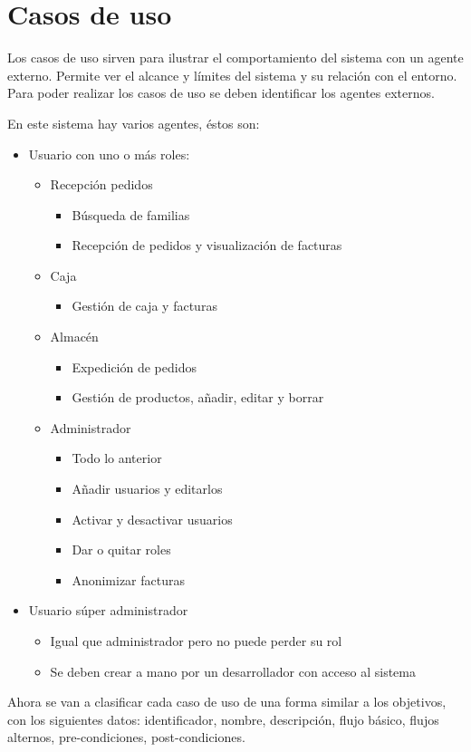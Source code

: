 \section{Casos de uso}
Los casos de uso sirven para ilustrar el comportamiento del sistema con un agente externo. Permite ver el alcance y límites del sistema y su relación con el entorno. Para poder realizar los casos de uso se deben identificar los agentes externos.
\vspace{1em}
\par En este sistema hay varios agentes, éstos son:
\begin{itemize}
    \item Usuario con uno o más roles:
    \begin{itemize}
        \item Recepción pedidos
        \begin{itemize}
            \item Búsqueda de familias
            \item Recepción de pedidos y visualización de facturas
        \end{itemize}
        \item Caja
        \begin{itemize}
            \item Gestión de caja y facturas
        \end{itemize}
        \item Almacén
        \begin{itemize}
            \item Expedición de pedidos
            \item Gestión de productos, añadir, editar y borrar
        \end{itemize}
        \item Administrador
        \begin{itemize}
            \item Todo lo anterior
            \item Añadir usuarios y editarlos
            \item Activar y desactivar usuarios
            \item Dar o quitar roles
            \item Anonimizar facturas
        \end{itemize}
    \end{itemize}
    \item Usuario súper administrador
    \begin{itemize}
        \item Igual que administrador pero no puede perder su rol
        \item Se deben crear a mano por un desarrollador con acceso al sistema
    \end{itemize}
\end{itemize}
\vspace{1em}
\par Ahora se van a clasificar cada caso de uso de una forma similar a los objetivos, con los siguientes datos: identificador, nombre, descripción, flujo básico, flujos alternos, pre-condiciones, post-condiciones.

